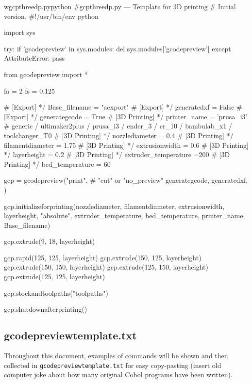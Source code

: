 \documentclass{ltxdoc}
\begin{document}
\lstset{firstnumber=1}%
\begin{writecode}{w}{gcpthreedp.py}{python}
#gcpthreedp.py --- Template for 3D printing
#                  Initial version.
#!/usr/bin/env python

import sys

try:
    if 'gcodepreview' in sys.modules:
        del sys.modules['gcodepreview']
except AttributeError:
    pass

from gcodepreview import *

fa = 2
fs = 0.125

# [Export] */
Base_filename = "aexport"
# [Export] */
generatedxf = False
# [Export] */
generategcode = True
# [3D Printing] */
printer_name = 'prusa_i3' # generic / ultimaker2plus / prusa_i3 / ender_3 / cr_10 / bambulab_x1 / toolchanger_T0
# [3D Printing] */
nozzlediameter = 0.4
# [3D Printing] */
filamentdiameter = 1.75
# [3D Printing] */
extrusionwidth = 0.6
# [3D Printing] */
layerheight = 0.2
# [3D Printing] */
extruder_temperature =200
# [3D Printing] */
bed_temperature = 60

gcp = gcodepreview("print", # "cut" or "no_preview"
                   generategcode,
                   generatedxf,
                   )

gcp.initializeforprinting(nozzlediameter,
                          filamentdiameter,
                          extrusionwidth,
                          layerheight,
                          "absolute", 
                          extruder_temperature, 
                          bed_temperature,
                          printer_name, 
                          Base_filename)

gcp.extrude(9, 18, layerheight)

gcp.rapid(125, 125, layerheight)
gcp.extrude(150, 125, layerheight)
gcp.extrude(150, 150, layerheight)
gcp.extrude(125, 150, layerheight) 
gcp.extrude(125, 125, layerheight) 
 
gcp.stockandtoolpaths("toolpaths")

gcp.shutdownafterprinting()

\end{writecode}
\addtocounter{gcpthreedp}{65}

\subsection{gcodepreviewtemplate.txt}

Throughout this document, examples of commands will be shown and then collected in \verb|gcodepreviewtemplate.txt| for easy copy-pasting (insert old computer joke about how many original Cobol programs have been written).
\end{document}
